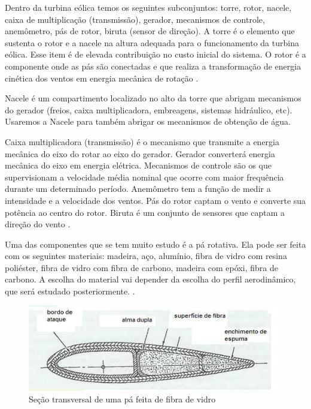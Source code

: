 Dentro da turbina eólica temos os seguintes subconjuntos: torre, rotor, nacele, caixa de multiplicação (transmissão),
gerador, mecanismos de controle, anemômetro, pás de rotor, biruta (sensor de direção). A torre é o elemento que sustenta
o rotor e a nacele na altura adequada para o funcionamento da turbina eólica. Esse item é de elevada contribuição no custo 
inicial do sistema. O rotor é a componente onde as pás são conectadas e que realiza a transformação de energia cinética dos
ventos em energia mecânica de rotação \cite{rossiEtAl}.

Nacele é um compartimento localizado no alto da torre que abrigam mecanismos do gerador (freios, caixa multiplicadora,
embreagens, sistemas hidráulico, etc). Usaremos a Nacele para também abrigar os mecanismos de obtenção de água. 
	
Caixa multiplicadora (transmissão) é o mecanismo que transmite a energia mecânica do eixo do rotar ao eixo do gerador.
Gerador converterá energia mecânica do eixo em energia elétrica. Mecanismos de controle são os que supervisionam a 
velocidade média nominal que ocorre com maior frequência durante um determinado período. Anemômetro tem a função de medir
a intensidade e a velocidade dos ventos. Pás do rotor captam o vento e converte sua potência ao centro do rotor.
Biruta é um conjunto de sensores que captam a direção do vento \cite{rossiEtAl}.
	
Uma das componentes que se tem muito estudo é a pá rotativa. Ela pode ser feita com os seguintes materiais: 
madeira, aço, alumínio, fibra de vidro com resina poliéster, fibra de vidro com fibra de carbono, madeira com epóxi,
fibra de carbono. A escolha do material vai depender da escolha do perfil aerodinâmico, que será estudado posteriormente.
\cite{portalEnergia}.

\begin{figure}[!htbp]
\centering
\includegraphics[scale=0.80]{editaveis/figuras/pa}
\caption[Seção transversal de uma pá feita de fibra de vidro]{Seção transversal de uma pá feita de fibra de vidro\footnotemark}
\FloatBarrier
\label{secao_transversal_pa}
\end{figure}


